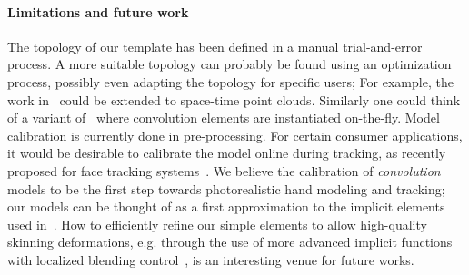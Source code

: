 \paragraph{Limitations and future work} 
The topology of our template has been defined in a manual trial-and-error process. A more suitable topology can probably be found using an optimization process, possibly even adapting the topology for specific users; For example, the work in~\cite{thiery2016spheremesh} could be extended to space-time point clouds. Similarly one could think of a variant of~\cite{newcombe2015dynfusion} where convolution elements are instantiated on-the-fly.
Model calibration is currently done in pre-processing. For certain consumer applications, it would be desirable to calibrate the model online during tracking, as recently proposed for face tracking systems~\cite{bouaziz2013online}. 
% 
We believe the calibration of \emph{convolution} models to be the first step towards photorealistic hand modeling and tracking; our models can be thought of as a first approximation to the implicit elements used in~\cite{vaillant2013implicit}. How to efficiently refine our simple elements to allow high-quality skinning deformations, e.g. through the use of more advanced implicit functions with localized blending control~\cite{zanni2013scale}, is an interesting venue for future works. 



